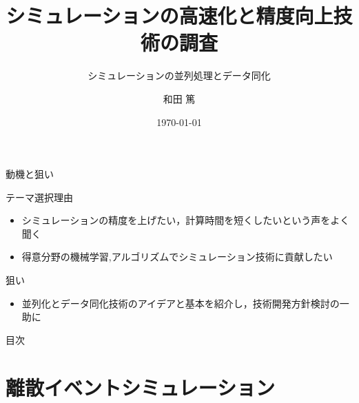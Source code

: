 \documentclass[dvipdfmx,uplatex,11pt]{beamer}
\title{シミュレーションの高速化と精度向上技術の調査}
\subtitle{シミュレーションの並列処理とデータ同化}
\author{和田 篤}
\date{\today}
\theoremstyle{definition}
\begin{document}
\begin{frame}
  \maketitle
\end{frame}

\begin{frame}{動機と狙い}

  \begin{block}{テーマ選択理由}
   \begin{itemize}
      \item シミュレーションの精度を上げたい，計算時間を短くしたいという声をよく聞く
      \item 得意分野の機械学習,アルゴリズムでシミュレーション技術に貢献したい
    \end{itemize}
  \end{block}

  \begin{block}{狙い}
   \begin{itemize}
      \item 並列化とデータ同化技術のアイデアと基本を紹介し，技術開発方針検討の一助に
    \end{itemize}
  \end{block}

\end{frame}

\begin{frame}{目次}
  \tableofcontents
\end{frame}

\section{離散イベントシミュレーション}
\end{document}
